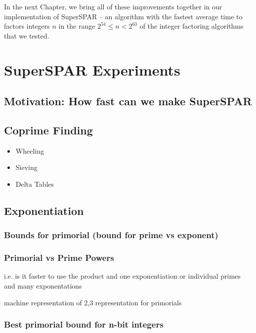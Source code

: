 \documentclass{ucalgthes1}
\theoremstyle{definition}
\begin{document}
In the next Chapter, we bring all of these improvements together in our implementation of SuperSPAR -- an algorithm with the fastest average time to factors integers $n$ in the range $2^{54} \le n < 2^{63}$ of the integer factoring algorithms that we tested.



\chapter{SuperSPAR Experiments}
\label{chap:ssparExperiments}

\section{Motivation: How fast can we make SuperSPAR}

\bigbreak
\section{Coprime Finding}
\begin{itemize}
\item Wheeling
\item Sieving
\item Delta Tables
\end{itemize}

\bigbreak
\section{Exponentiation}
\label{sec:ssparExp}
\subsection{Bounds for primorial (bound for prime vs exponent)}
\subsection{Primorial vs Prime Powers}
i.e. is it faster to use the product and one exponentiation or individual primes and many exponentations

machine representation of 2,3 representation for primorials

\subsection{Best primorial bound for n-bit integers}
\end{document}
